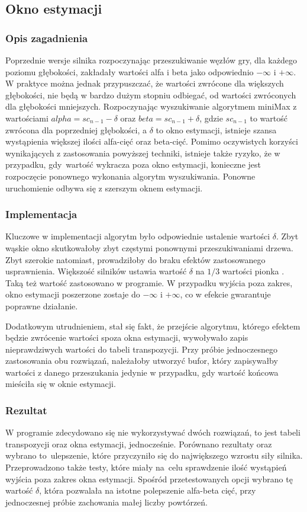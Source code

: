 \subsection{Okno estymacji}
\label{subsec:okno-estymacji}

\subsubsection{Opis zagadnienia}
Poprzednie wersje silnika rozpoczynając przeszukiwanie węzłów gry, dla każdego poziomu głębokości, zakładały wartości alfa i beta jako odpowiednio $-\infty$ i $+\infty$.
W praktyce można jednak przypuszczać, że wartości zwrócone dla większych głębokości, nie będą w bardzo dużym stopniu odbiegać, od wartości zwróconych dla głębokości mniejszych.
Rozpoczynając wyszukiwanie algorytmem miniMax z wartościami $alpha = sc_{n-1} - \delta$ oraz $beta = sc_{n-1} + \delta$, gdzie $sc_{n-1}$ to wartość zwrócona dla poprzedniej głębokości, a $\delta$ to okno estymacji, istnieje szansa wystąpienia większej ilości alfa-cięć oraz beta-cięć.
Pomimo oczywistych korzyści wynikających z zastosowania powyższej techniki, istnieje także ryzyko, że w przypadku, gdy~wartość wykracza poza okno estymacji, konieczne jest rozpoczęcie ponownego wykonania algorytm wyszukiwania.
Ponowne uruchomienie odbywa się z szerszym oknem estymacji.

\subsubsection{Implementacja}
Kluczowe w implementacji algorytm było odpowiednie ustalenie wartości $\delta$.
Zbyt wąskie okno skutkowałoby zbyt częstymi ponownymi przeszukiwaniami drzewa.
Zbyt szerokie natomiast, prowadziłoby do braku efektów zastosowanego usprawnienia.
Większość silników ustawia wartość $\delta$ na $1/3$ wartości pionka \cite*{duch}.
Taką też wartość zastosowano w programie.
W przypadku wyjścia poza zakres, okno estymacji poszerzone zostaje do $-\infty$ i $+\infty$, co w efekcie gwarantuje poprawne działanie.

Dodatkowym utrudnieniem, stał się fakt, że przejście algorytmu, którego efektem będzie zwrócenie wartości spoza okna estymacji, wywoływało zapis nieprawdziwych wartości do tabeli transpozycji.
Przy próbie jednoczesnego zastosowania obu rozwiązań, należałoby utworzyć bufor, który zapisywałby wartości z danego przeszukania jedynie w przypadku, gdy wartość końcowa mieściła się w oknie estymacji.

\subsubsection{Rezultat}
W programie zdecydowano się nie wykorzystywać dwóch rozwiązań, to jest tabeli transpozycji oraz okna estymacji, jednocześnie.
Porównano rezultaty oraz wybrano to~ulepszenie, które przyczyniło się do największego wzrostu siły silnika.
Przeprowadzono także testy, które miały na~celu sprawdzenie ilość wystąpień wyjścia poza zakres okna estymacji.
Spośród przetestowanych opcji wybrano tę wartość $\delta$, która pozwalała na istotne polepszenie alfa-beta cięć, przy jednoczesnej próbie zachowania małej liczby powtórzeń.
